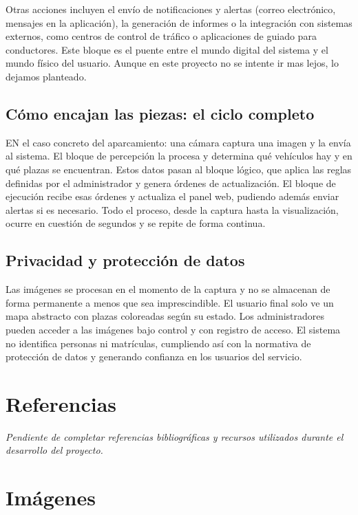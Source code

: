 \documentclass[12pt,a4paper]{article}
\begin{document}
Otras acciones incluyen el envío de notificaciones y alertas (correo electrónico, mensajes en la aplicación), la generación de informes o la integración con sistemas externos, como centros de control de tráfico o aplicaciones de guiado para conductores. Este bloque es el puente entre el mundo digital del sistema y el mundo físico del usuario. Aunque en este proyecto no se intente ir mas lejos, lo dejamos planteado.

\subsection{Cómo encajan las piezas: el ciclo completo}

EN el caso concreto del aparcamiento: una cámara captura una imagen y la envía al sistema. El bloque de percepción la procesa y determina qué vehículos hay y en qué plazas se encuentran. Estos datos pasan al bloque lógico, que aplica las reglas definidas por el administrador y genera órdenes de actualización. El bloque de ejecución recibe esas órdenes y actualiza el panel web, pudiendo además enviar alertas si es necesario. Todo el proceso, desde la captura hasta la visualización, ocurre en cuestión de segundos y se repite de forma continua.

\subsection{Privacidad y protección de datos}

Las imágenes se procesan en el momento de la captura y no se almacenan de forma permanente a menos que sea imprescindible. El usuario final solo ve un mapa abstracto con plazas coloreadas según su estado. Los administradores pueden acceder a las imágenes bajo control y con registro de acceso. El sistema no identifica personas ni matrículas, cumpliendo así con la normativa de protección de datos y generando confianza en los usuarios del servicio.

\section{Referencias}

\emph{Pendiente de completar referencias bibliográficas y recursos utilizados durante el desarrollo del proyecto.}

\section{Imágenes}
\end{document}
